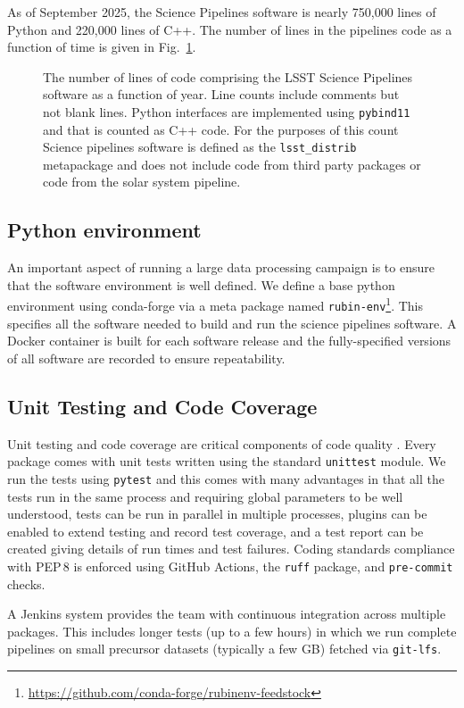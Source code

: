 As of September 2025, the Science Pipelines software is nearly 750,000 lines of Python and 220,000 lines of C++.
The number of lines in the pipelines code as a function of time is given in Fig.~\ref{fig:pipe-loc}.

\begin{figure}
\caption{The number of lines of code comprising the LSST Science Pipelines software as a function of year.
Line counts include comments but not blank lines. Python interfaces are implemented using \texttt{pybind11} and that is counted as C++ code. For the purposes of this count Science pipelines software is defined as the \texttt{lsst\_distrib} metapackage and does not include code from third party packages or code from the solar system pipeline.}
\label{fig:pipe-loc}
\end{figure}

\subsection{Python environment}

An important aspect of running a large data processing campaign is to ensure that the software environment is well defined.
We define a base python environment using conda-forge via a meta package named \texttt{rubin-env}\footnote{\url{https://github.com/conda-forge/rubinenv-feedstock}}.
This specifies all the software needed to build and run the science pipelines software.
A Docker container is built for each software release and the fully-specified versions of all software are recorded to ensure repeatability.

\subsection{Unit Testing and Code Coverage}

Unit testing and code coverage are critical components of code quality \citep{2018SPIE10707E..09J}.
Every package comes with unit tests written using the standard \texttt{unittest} module.
We run the tests using \texttt{pytest} \citep{pytest} and this comes with many advantages in that all the tests run in the same process and requiring global parameters to be well understood, tests can be run in parallel in multiple processes, plugins can be enabled to extend testing and record test coverage, and a test report can be created giving details of run times and test failures.
Coding standards compliance with PEP\,8 \citep{pep8} is enforced using GitHub Actions, the \texttt{ruff} package, and \texttt{pre-commit} checks.

A Jenkins system provides the team with continuous integration across multiple packages.
This includes longer tests (up to a few hours) in which we run complete pipelines on small precursor datasets (typically a few GB) fetched via \texttt{git-lfs}.
